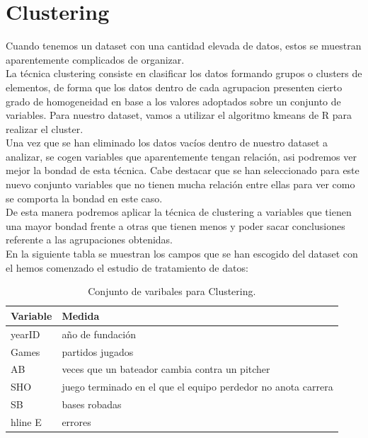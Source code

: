 \documentclass[10pt]{article}
\begin{document}
\section{Clustering}

Cuando tenemos un dataset con una cantidad elevada de datos, estos se muestran aparentemente complicados de organizar.\\

La técnica clustering consiste en clasificar los datos formando grupos o clusters de elementos, de forma que los datos dentro de cada agrupacion presenten cierto grado de homogeneidad en base a los valores adoptados sobre un conjunto de variables. Para 
nuestro dataset, vamos a utilizar el algoritmo kmeans de R para realizar el cluster.\\

Una vez que se han eliminado los datos vacíos dentro de nuestro dataset a analizar, se cogen variables que aparentemente tengan relación, asi podremos ver mejor la bondad de esta técnica. Cabe destacar que se han seleccionado para este nuevo conjunto variables que no tienen mucha relación entre ellas para ver como se comporta la bondad en este caso. \\

De esta manera podremos aplicar la técnica de clustering a variables que tienen una mayor bondad frente a otras que tienen menos y poder sacar conclusiones referente a las agrupaciones obtenidas.\\

En la siguiente tabla se muestran los campos que se han escogido del dataset con el hemos comenzado el estudio de tratamiento de datos:\\

\begin{table}[htbp]
\begin{center}
\begin{tabular}{|l|l|}
\hline
Variable & Medida \\
\hline \hline
yearID & año de fundación  \\ \hline
Games & partidos jugados \\ \hline
AB & veces que un bateador cambia contra un pitcher \\ \hline
SHO & juego terminado en el que el equipo perdedor no anota carrera \\ \hline
SB & bases robadas \\hline
E & errores \\ \hline
\end{tabular}
\caption{Conjunto de varibales para Clustering.}
\label{Tabla:}
\end{center}
\end{table}
\end{document}

